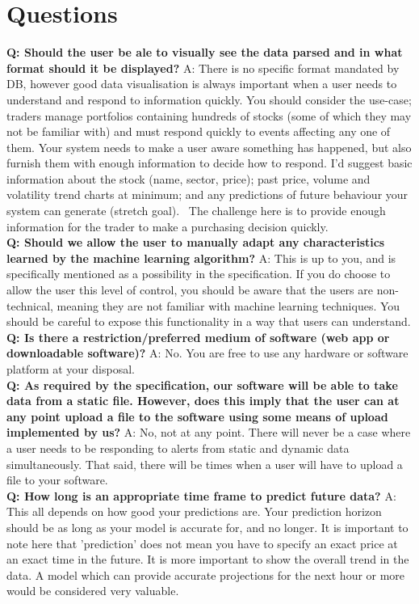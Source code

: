 \documentclass[10pt, oneside, a4paper]{article}
\begin{document}
\section{Questions}
\textbf{Q: Should the user be ale to visually see the data parsed and in what format should it be displayed?}
A: There is no specific format mandated by DB, however good data visualisation is always important when a user needs to
understand and respond to information quickly.
You should consider the use-case; traders manage portfolios containing hundreds of stocks (some of which they may not be
familiar with) and must respond quickly to events affecting any one of them. Your system needs to make a user aware something
has happened, but also furnish them with enough information to decide how to respond. I'd suggest basic information about the
stock (name, sector, price); past price, volume and volatility trend charts at minimum; and any predictions of future behaviour
your system can generate (stretch goal).  The challenge here is to provide enough information for the trader to make a purchasing
decision quickly. \\
\textbf{Q: Should we allow the user to manually adapt any characteristics learned by the machine learning algorithm?}
A: This is up to you, and is specifically mentioned as a possibility in the specification. If you do choose to allow the user
this level of control, you should be aware that the users are non-technical, meaning they are not familiar with machine learning
techniques. You should be careful to expose this functionality in a way that users can understand. \\
\textbf{Q: Is there a restriction/preferred medium of software (web app or downloadable software)?}
A: No. You are free to use any hardware or software platform at your disposal. \\
\textbf{Q: As required by the specification, our software will be able to take data from a static file. However, does this imply
that the user can at any point upload a file to the software using some means of upload implemented by us?}
A: No, not at any point. There will never be a case where a user needs to be responding to alerts from static and dynamic data
simultaneously. That said, there will be times when a user will have to upload a file to your software. \\
\textbf{Q: How long is an appropriate time frame to predict future data?}
A: This all depends on how good your predictions are. Your prediction horizon should be as long as your model is accurate for,
and no longer. It is important to note here that 'prediction' does not mean you have to specify an exact price at an exact time
in the future. It is more important to show the overall trend in the data. A model which can provide accurate projections for the
next hour or more would be considered very valuable.
\end{document}
